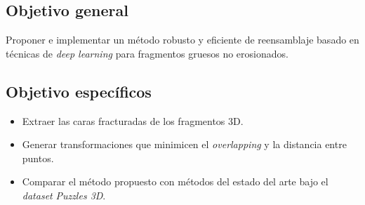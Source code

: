 
\subsection{Objetivo general}

Proponer e implementar un método robusto y eficiente de reensamblaje basado en técnicas de \textit{deep learning} para fragmentos gruesos no erosionados.  

\subsection{Objetivo específicos}

\begin{itemize}
    \item Extraer las caras fracturadas de los fragmentos 3D.
    \item Generar transformaciones que minimicen el \textit{overlapping} y la distancia entre puntos.
    \item Comparar el método propuesto con métodos del estado del arte bajo el \textit{dataset} \textit{Puzzles 3D}. 
\end{itemize}
